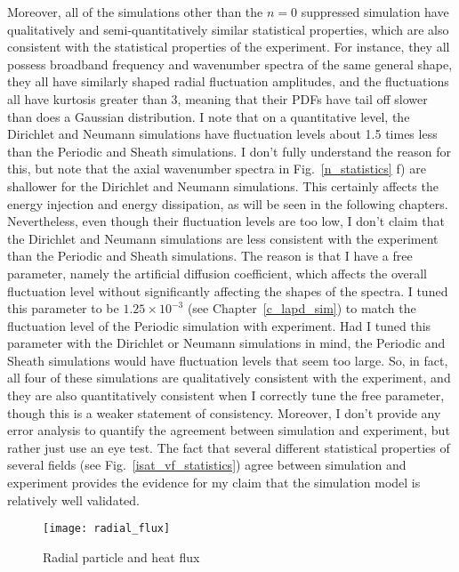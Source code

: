 Moreover, all of the simulations other than the $n=0$ suppressed simulation have qualitatively and semi-quantitatively similar statistical properties, which are also consistent with the
statistical properties of the experiment. For instance, they all possess broadband
frequency and wavenumber spectra of the same general shape, they all have similarly shaped radial fluctuation amplitudes,
and the fluctuations all have kurtosis greater than 3, meaning that their PDFs have tail off slower than does a Gaussian distribution.
I note that on a quantitative level,
the Dirichlet and Neumann simulations have fluctuation levels about 1.5 times less than the Periodic and Sheath simulations. I don't fully understand the reason for this, but note
that the axial wavenumber spectra in Fig.~\ref{n_statistics} f) are shallower for the Dirichlet and Neumann simulations. This certainly affects the energy injection and energy
dissipation, as will be seen in the following chapters. Nevertheless, even though their fluctuation levels are too low,
I don't claim that the Dirichlet and Neumann simulations are less consistent with the experiment than the
Periodic and Sheath simulations. The reason is that I have a free parameter, namely the artificial
diffusion coefficient, which affects the overall fluctuation level without significantly affecting the shapes of the spectra. I tuned this parameter to be 
$1.25 \times 10^{-3}$ (see Chapter~\ref{c_lapd_sim})
to match the fluctuation level of the Periodic simulation with experiment. Had I tuned this parameter with the Dirichlet or Neumann simulations in mind, 
the Periodic and Sheath simulations would have fluctuation levels that seem too large. So, in fact, all four of these simulations are qualitatively consistent with the experiment, and they are also
quantitatively consistent when I correctly tune the free parameter, though this is a weaker statement of consistency. Moreover, I don't provide any error analysis to quantify the agreement
between simulation and experiment, but rather just use an eye test. The fact that several different statistical properties of several fields (see Fig.~\ref{isat_vf_statistics})
agree between simulation and experiment provides the evidence for my claim that the simulation model is relatively well validated.

\begin{figure}
\centerline{\texttt{[image: radial\_flux]}}
\caption{Radial particle and heat flux}
\label{radial_flux}
\end{figure}

